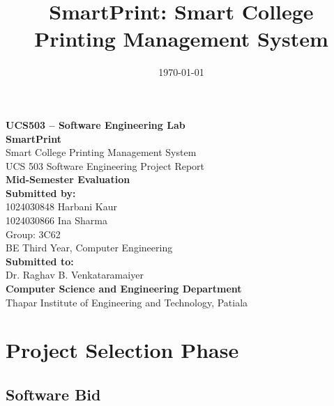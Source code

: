 \documentclass[12pt,a4paper]{report}
\title{\textbf{SmartPrint: Smart College Printing Management System}}
\date{\today}
\begin{document}
\begin{titlepage}
  \centering
  \vspace*{1cm}
  {\small\bfseries UCS503 -- Software Engineering Lab}\\[2cm]

  {\LARGE\bfseries SmartPrint}\\[0.3cm]
  {\Large Smart College Printing Management System}\\[1.2cm]

  {\large UCS 503 Software Engineering Project Report}\\[0.3cm]
  {\large\bfseries Mid-Semester Evaluation}\\[2cm]

  {\bfseries Submitted by:}\\[0.5cm]
  1024030848 \quad Harbani Kaur\\[0.2cm]
  1024030866 \quad Ina Sharma\\[1cm]

  Group: 3C62\\
  BE Third Year, Computer Engineering\\[1.5cm]

  {\bfseries Submitted to:}\\[0.3cm]
  Dr. Raghav B. Venkataramaiyer\\[2cm]

  \vfill
  {\bfseries Computer Science and Engineering Department}\\
  Thapar Institute of Engineering and Technology, Patiala
\end{titlepage}

\tableofcontents
\clearpage

\chapter{Project Selection Phase}

\section{Software Bid}
\end{document}
